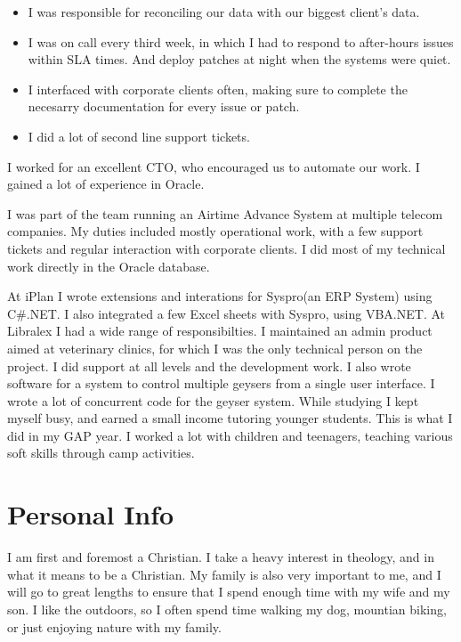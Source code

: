 \documentclass[a4paper]{twentysecondcv} %
\begin{document}
\begin{twenty}
{\begin{itemize}
        \item I was responsible for reconciling our data with our biggest client's data.
        \item I was on call every third week, in which I had to respond to after-hours issues within SLA times. And deploy patches at night when the systems were quiet.
        \item I interfaced with corporate clients often, making sure to complete the necesarry documentation for every issue or patch.
        \item I did a lot of second line support tickets.
    \end{itemize}
    I worked for an excellent CTO, who encouraged us to automate our work. I gained a lot of experience in Oracle.}
    {I was part of the team running an Airtime Advance System at multiple telecom companies. My duties included mostly operational work, with a few support tickets and regular interaction with corporate clients. I did most of my technical work directly in the Oracle database.}
\end{twenty}

\newpage %

\makeprofile %

\begin{twenty}
    {At iPlan I wrote extensions and interations for Syspro(an ERP System) using C\#.NET. I also integrated a few Excel sheets with Syspro, using VBA.NET.}
    {At Libralex I had a wide range of responsibilties. I maintained an admin product aimed at veterinary clinics, for which I was the only technical person on the project. I did support at all levels and the development work. I also wrote software for a system to control multiple geysers from a single user interface. I wrote a lot of concurrent code for the geyser system.}
    {While studying I kept myself busy, and earned a small income tutoring younger students.}
    {This is what I did in my GAP year. I worked a lot with children and teenagers, teaching various soft skills through camp activities.}
\end{twenty}

\section{Personal Info}

I am first and foremost a Christian. I take a heavy interest in theology, and in what it means to be a Christian.
My family is also very important to me, and I will go to great lengths to ensure that I spend enough time with my wife and my son.
I like the outdoors, so I often spend time walking my dog, mountian biking, or just enjoying nature with my family.
\end{document}
